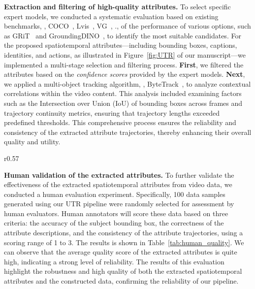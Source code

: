 \textbf{Extraction and filtering of high-quality attributes.} To select specific expert models, we conducted a systematic evaluation based on existing benchmarks, \eg, COCO~\citep{coco}, Lvis~\citep{gupta2019lvis}, VG~\citep{krishna2017visual}, \etc., of the performance of various options, such as GRiT~\citep{wu2022grit} and GroundingDINO~\citep{liu2023grounding}, to identify the most suitable candidates. For the proposed spatiotemporal attributes—including bounding boxes, captions, identities, and actions, as illustrated in Figure~\ref{fig:UTR} of our manuscript—we implemented a multi-stage selection and filtering process. \textbf{First}, we filtered the attributes based on the \textit{confidence scores} provided by the expert models. \textbf{Next}, we applied a multi-object tracking algorithm, \ie, ByteTrack~\citep{zhang2022bytetrack}, to analyze contextual correlations within the video content. This analysis included examining factors such as the Intersection over Union (IoU) of bounding boxes across frames and trajectory continuity metrics, ensuring that trajectory lengths exceeded predefined thresholds. This comprehensive process ensures the reliability and consistency of the extracted attribute trajectories, thereby enhancing their overall quality and utility.

\begin{wraptable}{r}{0.57\textwidth}
    \caption{\textbf{Human validation} of extracted attributes.}
    \vspace{-1em}
    \label{tab:human_quality}
    \begin{center}        
    \def\arraystretch{1}
    \end{center}
\end{wraptable}

\textbf{Human validation of the extracted attributes.} To further validate the effectiveness of the extracted spatiotemporal attributes from video data, we conducted a human evaluation experiment. Specifically, 100 data samples generated using our UTR pipeline were randomly selected for assessment by human evaluators.
Human annotators will score these data based on three criteria: the accuracy of the subject bounding box, the correctness of the attribute descriptions, and the consistency of the attribute trajectories, using a scoring range of 1 to 3. The results is shown in Table~\ref{tab:human_quality}. We can observe that the average quality score of the extracted attributes is quite high, indicating a strong level of reliability. The results of this evaluation highlight the robustness and high quality of both the extracted spatiotemporal attributes and the constructed data, confirming the reliability of our pipeline.

